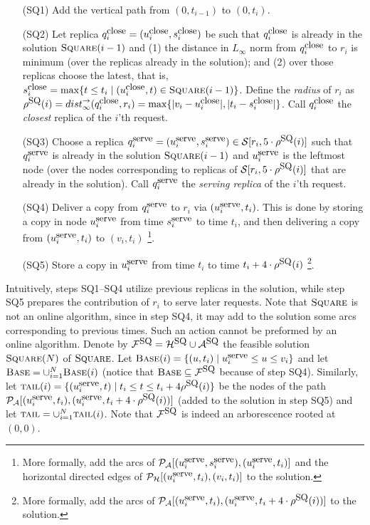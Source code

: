 \documentclass[11pt]{article}
\newcommand{\calH}{\mathcal{H}}
\newcommand{\calA}{\mathcal{A}}
\newcommand{\calF}{\mathcal{F}}
\newcommand{\calP}{\mathcal{P}}
\newcommand{\calS}{\mathcal{S}}
\newcommand{\DBase}[0]{{\mbox{\sc Base}}}
\newcommand{\Square}[0]{\mbox{\sc Square}}
\newcommand{\rep}[2]{(#1,#2)}
\newcommand{\rr}{r}
\newcommand{\NN}{N}
\newcommand{\distinf}[1]{{dist}^{\rightarrow}_{\infty}(#1)}
\newcommand{\qSQ}{q^{\mbox{\small\upshape serve}}}
\newcommand{\uSQ}{u^{\mbox{\small\upshape serve}}}
\newcommand{\sSQ}{s^{\mbox{\small\upshape serve}}}
\newcommand{\qclose}{q^{\mbox{\small\upshape close}}}
\newcommand{\uclose}{u^{\mbox{\small\upshape close}}}
\newcommand{\sclose}{s^{\mbox{\small\upshape close}}}
\newcommand{\tail}[0]{\mbox{\sc tail}}
\newcommand{\FSQ}[0]{\calF^{\mbox{\small\upshape SQ}}}
\newcommand{\HSQ}[0]{\calH^{\mbox{\small\upshape SQ}}}
\newcommand{\ASQ}[0]{\calA^{\mbox{\small\upshape SQ}}}
\newcommand{\rhoSQ}[0]{\rho^{\mbox{\small\upshape SQ}}}
\newcommand{\seq}[1]{\calS[#1]}
\begin{document}
\begin{itemize}

\item[(SQ1)] Add the vertical path from $(0,t_{i-1})$ to $(0,t_i)$.


\item[(SQ2)] Let replica $\qclose_i=\rep{\uclose_i}{\sclose_i}$ be such that $\qclose_i$ is already in the solution $\Square(i-1)$ and
    (1) the distance in $L_\infty$ norm from $\qclose_i$ to $\rr_i$ is minimum (over the replicas already in the solution); and
    (2) over those replicas choose the latest,
    that is, $\sclose_i=\max\{t\leq t_i \mid (\uclose_i,t)\in\Square(i-1)\}$.
Define the {\em radius} of $\rr_i$ as $\rhoSQ(i)=\distinf{\qclose_i,\rr_i}=\max\{|v_i-\uclose_i|,|t_i-\sclose_i|\}$.
Call $\qclose_i$ the {\em closest} replica of the $i$'th request.




\item [(SQ3)] Choose a replica $\qSQ_i=\rep{\uSQ_i}{\sSQ_i}\in\seq{r_i,5\cdot\rhoSQ(i)}$ such that $\qSQ_i$ is already in the solution $\Square(i-1)$
              and $\uSQ_i$ is the leftmost node (over the nodes corresponding to replicas of $\seq{r_i,5\cdot\rhoSQ(i)}$ that are already in the solution).
              Call $\qSQ_i$ the {\em serving replica} of the $i$'th request.



\item[(SQ4)]
Deliver a copy from $\qSQ_i$ to $\rr_i$ via $(\uSQ_i,t_i)$.
This is done by storing a copy in node $\uSQ_i$
from time $\sSQ_i$ to time $t_i$,
and then delivering a copy from $\rep{\uSQ_i}{t_i}$ to $\rep{v_i}{t_i}$
\footnote{More formally, add the arcs of $\calP_\calA[\rep{\uSQ_i}{\sSQ_i},
\rep{\uSQ_i}{t_i}]$
and the horizontal directed edges of $\calP_\calH[(\uSQ_i,t_i),(v_i,t_i)]$
to the solution.
}.


\item[(SQ5)]
Store a copy in $\uSQ_i$ from time $t_i$ to time $t_i+4\cdot\rhoSQ(i)$
\footnote{
More formally, add the arcs of $\calP_\calA[\rep{\uSQ_i}{t_i},\rep{\uSQ_i}{t_i+4\cdot\rhoSQ(i)}]$
to the solution.
}.

\end{itemize}


\noindent Intuitively, steps SQ1--SQ4 utilize previous replicas in the solution, while
step SQ5 prepares the contribution of $r_i$ to serve later requests.
Note that $\Square$ is not an online algorithm, since in step SQ4,
it may add to the solution some arcs corresponding to previous times.
Such an action cannot be preformed by an online algorithm.
Denote by $\FSQ=\HSQ\cup\ASQ$ the feasible solution $\Square(\NN)$ of $\Square$.
Let $\DBase(i)=\{(u,t_i) \mid  \uSQ_i\leq u\leq v_i\}$ and let $\DBase=\cup_{i=1}^{\NN}\DBase(i)$
(notice that $\DBase\subseteq \FSQ$ because of step SQ4).
Similarly, let $\tail(i)=\{(\uSQ_i,t) \mid t_i\leq t\leq t_i+4\rhoSQ(i)\}$
be the nodes of the path $\calP_\calA[\rep{\uSQ_i}{t_i},\rep{\uSQ_i}{t_i+4\cdot\rhoSQ(i)}]$
(added to the solution in  step SQ5)
and let $\tail=\cup_{i=1}^{\NN}\tail(i)$.
Note that $\FSQ$ is indeed an arborescence rooted at $(0,0)$.
\end{document}

